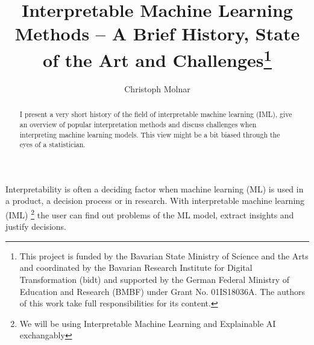 \documentclass[runningheads]{llncs}
\begin{document}
%
\title{Interpretable Machine Learning Methods -- A Brief History, State of the Art and Challenges\thanks{This project is funded by the Bavarian State Ministry of Science and the Arts and coordinated by the Bavarian Research Institute for Digital Transformation (bidt) and supported by the German Federal Ministry of Education and Research (BMBF) under Grant No. 01IS18036A.
The authors of this work take full responsibilities for its content.
}}
%
%
\author{Christoph Molnar}
%
%
%
\maketitle              %
%
\begin{abstract}
  I present a very short history of the field of interpretable machine learning (IML), give an overview of popular interpretation methods and discuss challenges when interpreting machine learning models.
  This view might be a bit biased through the eyes of a statistician.

\end{abstract}
%
%
Interpretability is often a deciding factor when machine learning (ML) is used in a product, a decision process or in research.
With interpretable machine learning (IML) \footnote{We will be using Interpretable Machine Learning and Explainable AI exchangably} the user can find out problems of the ML model, extract insights and justify decisions.
\end{document}
